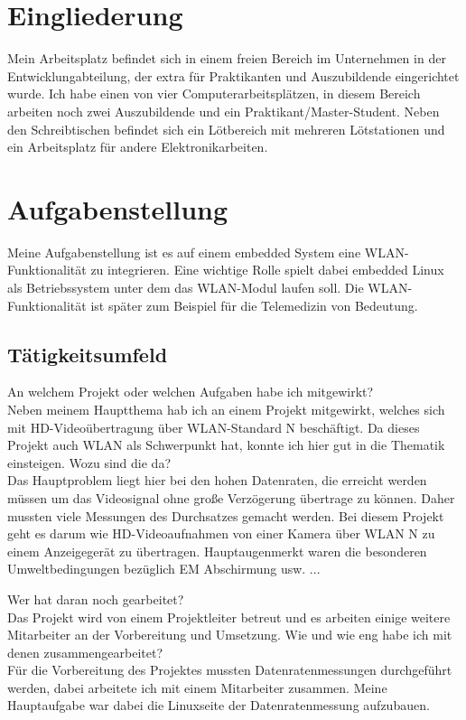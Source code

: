 \documentclass[pdftex,12pt,a4paper]{scrreprt}
\begin{document}
\section{Eingliederung}
Mein Arbeitsplatz befindet sich in einem freien Bereich im Unternehmen in der Entwicklungabteilung,
der extra für Praktikanten und Auszubildende eingerichtet wurde.
Ich habe einen von vier Computerarbeitsplätzen, in diesem Bereich arbeiten noch zwei Auszubildende und ein Praktikant/Master-Student.
Neben den Schreibtischen befindet sich ein Lötbereich mit mehreren Lötstationen und ein Arbeitsplatz für andere Elektronikarbeiten.
\section{Aufgabenstellung}
Meine Aufgabenstellung ist es auf einem embedded System eine WLAN-Funktionalität zu integrieren.
Eine wichtige Rolle spielt dabei embedded Linux als Betriebssystem unter dem das WLAN-Modul laufen soll.
Die WLAN-Funktionalität ist später zum Beispiel für die Telemedizin von Bedeutung.
\subsection{Tätigkeitsumfeld}
An welchem Projekt oder welchen Aufgaben habe ich mitgewirkt?\\
Neben meinem Hauptthema hab ich an einem Projekt mitgewirkt, welches sich mit HD-Videoübertragung über WLAN-Standard N beschäftigt.
Da dieses Projekt auch WLAN als Schwerpunkt hat, konnte ich hier gut in die Thematik einsteigen. Wozu sind die da?\\
Das Hauptproblem liegt hier bei den hohen Datenraten, die erreicht werden müssen um das Videosignal ohne große Verzögerung übertrage zu können. Daher mussten viele Messungen des Durchsatzes gemacht werden.
Bei diesem Projekt geht es darum wie HD-Videoaufnahmen von einer Kamera
über WLAN N zu einem Anzeigegerät zu übertragen. Hauptaugenmerkt waren
die besonderen Umweltbedingungen bezüglich EM Abschirmung usw. ...

Wer hat daran noch gearbeitet?\\
Das Projekt wird von einem Projektleiter betreut und es arbeiten einige weitere Mitarbeiter an der Vorbereitung und Umsetzung.
Wie und wie eng habe ich mit denen zusammengearbeitet?\\
Für die Vorbereitung des Projektes mussten Datenratenmessungen durchgeführt werden, dabei arbeitete ich mit einem Mitarbeiter zusammen.
Meine Hauptaufgabe war dabei die Linuxseite der Datenratenmessung aufzubauen.
\end{document}
